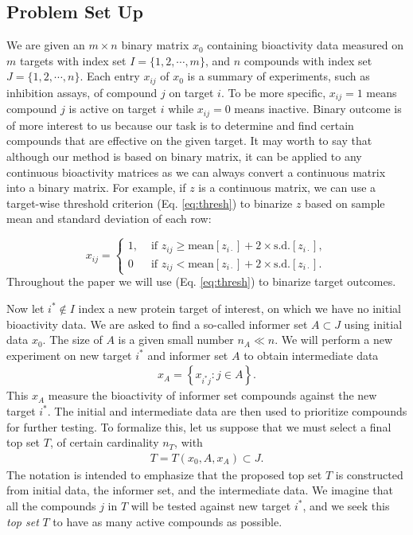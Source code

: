 \documentclass[12pt]{article}
\begin{document}
\subsection{Problem Set Up}

We are given an $m \times n$ binary matrix $x_0$ containing bioactivity data measured on $m$ targets with index set $I = \{1,2,\cdots,m\}$, and $n$ compounds with index set $J=\{1,2,\cdots,n\}$.  Each entry $x_{ij}$ of $x_0$ is a summary of experiments, such as inhibition assays,
of compound $j$ on target $i$. To be more specific, $x_{ij} = 1$ means compound $j$ is active on target $i$ while $x_{ij} = 0$ means inactive. Binary outcome is of more interest to us because our task is to determine and find certain compounds that are effective on the given target. It may worth to say that although our method is based on binary matrix, it can be applied to any continuous bioactivity matrices as we can always convert a continuous matrix into a binary matrix. For example, if $z$ is a continuous matrix, we can use a target-wise threshold criterion (Eq. \ref{eq:thresh}) to binarize $z$ based on sample mean and standard deviation of each row:

\begin{equation}\label{eq:thresh}
x_{ij} = \begin{cases}
		1, &\text{ if }
	      z_{ij} \geq \mbox{mean}[z_{i\cdot}] + 2 \times \mbox{s.d.}[z_{i\cdot}],\\
		0 & \text{ if }
	      z_{ij} < \mbox{mean}[z_{i\cdot}] + 2 \times \mbox{s.d.}[z_{i\cdot}].
	\end{cases}
\end{equation}
Throughout the paper we will use (Eq. \ref{eq:thresh}) to binarize target outcomes.  

Now let $i^* \notin I$ index a new protein target of interest, on which we have no initial bioactivity data.   
We are asked to find a so-called informer set $A \subset J$ using initial data $x_0$. The size of $A$ is a
given small number $n_A \ll n$. We will perform
a new experiment on new target $i^*$ and informer set $A$ to obtain intermediate data 
\begin{eqnarray*}
x_{A} = \left\{ x_{i^*j}: j \in A \right\}.
\end{eqnarray*}
This $x_A$ measure the bioactivity of informer
set compounds against the new target $i^*$.  The initial and intermediate
data are then used to prioritize compounds for further testing.
To formalize this, let us suppose that we must select a final
top set $T$, of certain cardinality $n_T$, with
\begin{eqnarray*}
T = T\left( x_0, A, x_A \right) \subset J.
\end{eqnarray*}
The notation is intended to emphasize that the proposed top set $T$ is constructed
from initial data, the informer set, and the intermediate data.
We imagine that all the compounds $j$ in $T$ will be
tested against new target $i^*$, and we seek this  {\em top set} $T$ to have as many
active compounds as possible.
\end{document}
